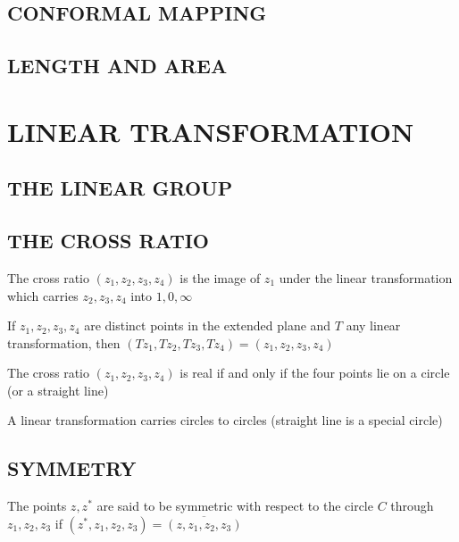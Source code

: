 \documentclass{report}
\begin{document}
\subsection{CONFORMAL MAPPING}

\subsection{LENGTH AND AREA}

\section{LINEAR TRANSFORMATION}

\subsection{THE LINEAR GROUP}

\subsection{THE CROSS RATIO}

\begin{definition}
    The cross ratio $(z_1, z_2, z_3, z_4)$ is the image of $z_1$ under the linear transformation which carries $z_2, z_3, z_4$ into $1, 0, \infty$
\end{definition}

\begin{theorem}
    If $z_1, z_2, z_3, z_4$ are distinct points in the extended plane and $T$ any linear transformation, then $(Tz_1, Tz_2, Tz_3, Tz_4) = (z_1, z_2, z_3, z_4)$
\end{theorem}

\begin{theorem}
    The cross ratio $(z_1, z_2, z_3, z_4)$ is real if and only if the four points lie on a circle (or a straight line)
\end{theorem}

\begin{theorem}
    A linear transformation carries circles to circles (straight line is a special circle)
\end{theorem}

\subsection{SYMMETRY}

\begin{definition}
    The points $z, z^*$ are said to be symmetric with respect to the circle $C$ through $z_1, z_2, z_3$ if $(z^*, z_1, z_2, z_3) = \overline{(z, z_1, z_2, z_3)}$
\end{definition}
\end{document}
